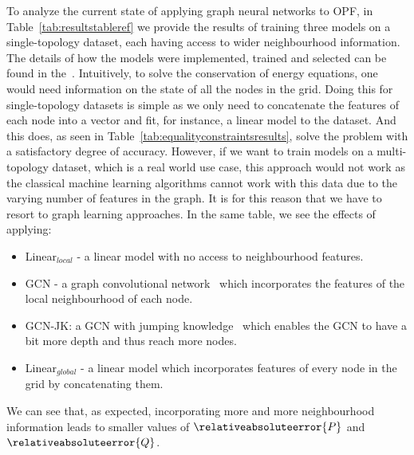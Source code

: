 To analyze the current state of applying graph neural networks to
OPF, in Table~\ref{tab:resultstableref} we provide the results of training three models on a single-topology dataset, each having access to
wider neighbourhood information.
The details of how the models were implemented, trained and selected can be found in the~.
Intuitively, to solve the conservation of energy equations, one would need information on the
state of all the nodes in the grid.
Doing this for single-topology datasets is simple as we only need to concatenate the
features of each node into a vector and fit, for instance, a linear model to the dataset.
And this does, as seen in Table~\ref{tab:equalityconstraintsresults},
solve the problem with a satisfactory degree of accuracy.
However, if we want to train models on a multi-topology dataset, which is a real world use case,
this approach would not work as the classical machine learning algorithms cannot work with
this data due to the varying number of features in the graph.
It is for this reason that we have to resort to graph learning approaches.
In the same table, we see the effects of applying:

\begin{itemize}
    \item Linear$_{local}$ - a linear model with no access to neighbourhood features.
    \item GCN - a graph convolutional network~\cite{kipf2016semi} which incorporates the features of the
    local neighbourhood of each node.
    \item GCN-JK: a GCN with jumping knowledge~\cite{xu2018representation} which enables the GCN to have a bit
    more depth and thus reach more nodes.
    \item Linear$_{global}$ - a linear model which incorporates features of every node in the grid
    by concatenating them.
\end{itemize}

\noindent We can see that, as expected, incorporating more and more neighbourhood information leads to
smaller values of $\relativeabsoluteerror{P}$ and $\relativeabsoluteerror{Q}$.

